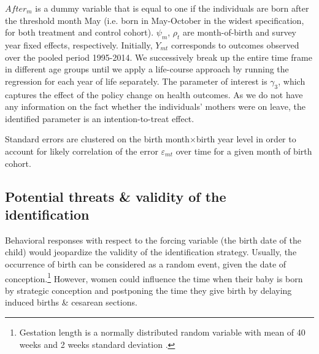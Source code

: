 \documentclass[11pt, a4paper]{article} %
\begin{document}
$After_{m}$ is a dummy variable that is equal to one if the individuals are born after the threshold month May (i.e. born in May-October in the widest specification, for both treatment and control cohort). $\psi_m$, $\rho_t$ are month-of-birth and survey year fixed effects, respectively. Initially, $Y_{mt}$ corresponds to outcomes observed over the pooled period 1995-2014. We successively break up the entire time frame in different age groups until we apply a life-course approach by running the regression for each year of life separately.\newline 
The parameter of interest is $\gamma_3$, which captures the effect of the policy change on health outcomes. As we do not have any information on the fact whether the individuals' mothers were on leave, the identified parameter is an intention-to-treat effect. \newline

Standard errors are clustered on the birth month$\times$birth year level in order to account for likely correlation of the error $\varepsilon_{mt}$ over time for a given month of birth cohort.



\bigskip
\subsection{Potential threats \& validity of the identification}\label{sec:empirical_strategy_threats+validity}
Behavioral responses with respect to the forcing variable (the birth date of the child) would jeopardize the validity of the identification strategy. Usually, the occurrence of birth can be considered as a random event, given the date of conception.\footnote{Gestation length is a normally distributed random variable with mean of 40 weeks and 2 weeks standard deviation \citep{Ekberg2013parental}.} However, women could influence the time when their baby is born by strategic conception and postponing the time they give birth by delaying induced births \& cesarean sections.  
\end{document}
